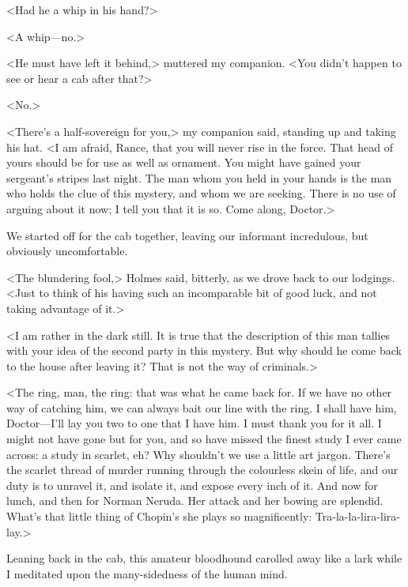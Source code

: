 <Had he a whip in his hand?>

<A whip—no.>

<He must have left it behind,> muttered my companion. <You didn't happen to see or hear a cab after that?>

<No.>

<There's a half-sovereign for you,> my companion said, standing up and taking his hat. <I am afraid, Rance, that you will never rise in the force. That head of yours should be for use as well as ornament. You might have gained your sergeant's stripes last night. The man whom you held in your hands is the man who holds the clue of this mystery, and whom we are seeking. There is no use of arguing about it now; I tell you that it is so. Come along, Doctor.>

We started off for the cab together, leaving our informant incredulous, but obviously uncomfortable.

<The blundering fool,> Holmes said, bitterly, as we drove back to our lodgings. <Just to think of his having such an incomparable bit of good luck, and not taking advantage of it.>

<I am rather in the dark still. It is true that the description of this man tallies with your idea of the second party in this mystery. But why should he come back to the house after leaving it? That is not the way of criminals.>

<The ring, man, the ring: that was what he came back for. If we have no other way of catching him, we can always bait our line with the ring. I shall have him, Doctor—I'll lay you two to one that I have him. I must thank you for it all. I might not have gone but for you, and so have missed the finest study I ever came across: a study in scarlet, eh? Why shouldn't we use a little art jargon. There's the scarlet thread of murder running through the colourless skein of life, and our duty is to unravel it, and isolate it, and expose every inch of it. And now for lunch, and then for Norman Neruda. Her attack and her bowing are splendid. What's that little thing of Chopin's she plays so magnificently: Tra-la-la-lira-lira-lay.>

Leaning back in the cab, this amateur bloodhound carolled away like a lark while I meditated upon the many-sidedness of the human mind.